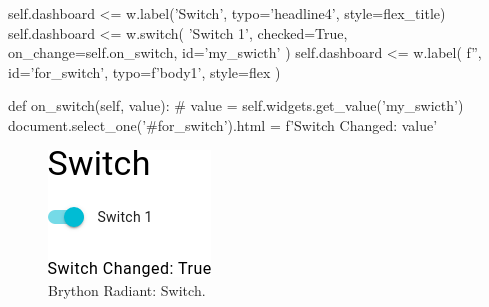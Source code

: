 \begin{python}
    self.dashboard <= w.label('Switch', typo='headline4', style=flex_title)
    self.dashboard <= w.switch(
        'Switch 1', checked=True, on_change=self.on_switch, id='my_swicth'
    )
    self.dashboard <= w.label(
        f'', id='for_switch', typo=f'body1', style=flex
    )


def on_switch(self, value):
    # value = self.widgets.get_value('my_swicth')
    document.select_one('#for_switch').html = f'Switch Changed: {value}'
\end{python}


\begin{figure}[H]
\begin{centering}
\includegraphics[scale=0.5]{Cap4/Figures/widgets/switch.png}
\par\end{centering}
\caption[Brython Radiant: Switch]{Brython Radiant: Switch.}
\label{fig:radiant_switch}
\end{figure}